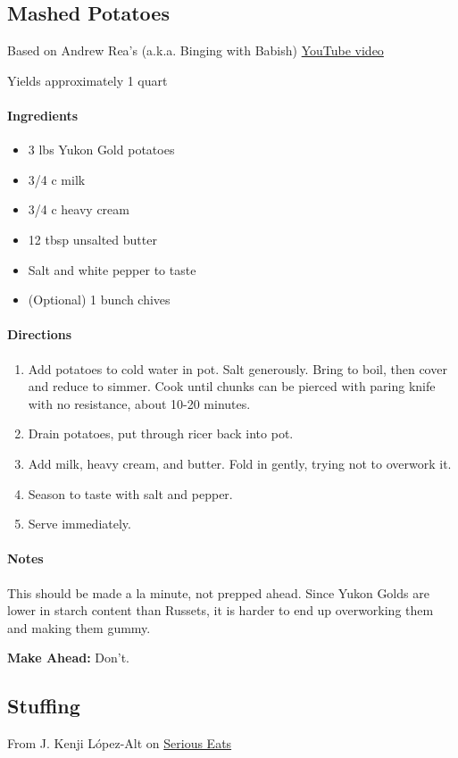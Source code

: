 \documentclass[12pt]{article}
\newenvironment*{ingredients}
	{
		\paragraph*{Ingredients}
		\begin{itemize}
	}
	{
		\end{itemize}
	}
\newenvironment*{directions}
	{
		\paragraph*{Directions}
		\begin{enumerate}
	}
	{
		\end{enumerate}
	}
\newenvironment*{notes}
	{
		\paragraph*{Notes}
		\begin{adjustwidth}{1cm}{}
	}
	{
		\end{adjustwidth}
	}
\begin{document}
	\newpage
	
	\subsection{Mashed Potatoes}
	Based on Andrew Rea's (a.k.a. Binging with Babish) \href{https://youtu.be/ZLnWdPPJvYg?si=7kN4RYZfTfVTtFed}{YouTube video}
	
	Yields approximately 1 quart
	
	\begin{ingredients}
		\item 3 lbs Yukon Gold potatoes
		\item 3/4 c milk
		\item 3/4 c heavy cream
		\item 12 tbsp unsalted butter
		\item Salt and white pepper to taste
		\item (Optional) 1 bunch chives
	\end{ingredients}
	
	\begin{directions}
		\item Add potatoes to cold water in pot. Salt generously. Bring to boil, then cover and reduce to simmer. Cook until chunks can be pierced with paring knife with no resistance, about 10-20 minutes.
		\item Drain potatoes, put through ricer back into pot.
		\item Add milk, heavy cream, and butter. Fold in gently, trying not to overwork it.
		\item Season to taste with salt and pepper.
		\item Serve immediately.
	\end{directions}
	
	\begin{notes}
		This should be made a la minute, not prepped ahead. Since Yukon Golds are lower in starch content than Russets, it is harder to end up overworking them and making them gummy.
		
		\textbf{Make Ahead:} Don't.
	\end{notes}
	
	\newpage
	
	\subsection{Stuffing}
	From J. Kenji L\'{o}pez-Alt on \href{https://www.seriouseats.com/classic-sage-and-sausage-stuffing-or-dressing-recipe}{Serious Eats}
	
\end{document}
